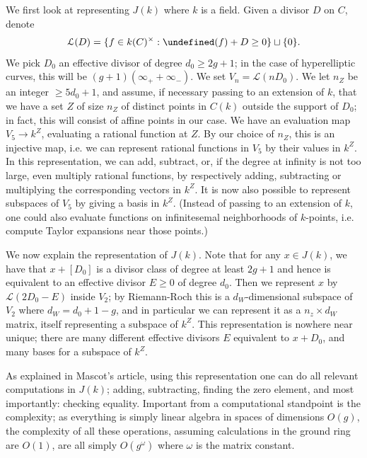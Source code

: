 \documentclass[12pt]{article}
\newcommand{\Lcal}{\mathcal{L}}
\let\div\undefined
\DeclareMathOperator{\div}{div}
\theoremstyle{plain}
\theoremstyle{definition}
\theoremstyle{remark}
\begin{document}
We first look at representing $J(k)$ where $k$ is a field. Given a divisor $D$ on $C$, denote
\[
\Lcal(D) = \{f \in k(C)^\times : \div(f) + D \geq 0 \} \sqcup \{0\}.
\]
We pick $D_0$ an effective divisor of degree $d_0 \geq 2g+1$; in the case of hyperelliptic curves, this will be $(g+1)(\infty_+ + \infty_-)$. We set $V_n = \Lcal(nD_0)$. We let $n_Z$ be an integer $\geq 5d_0 + 1$, and assume, if necessary passing to an extension of $k$, that we have a set $Z$ of size $n_Z$ of distinct points in $C(k)$ outside the support of $D_0$; in fact, this will consist of affine points in our case. We have an evaluation map $V_5 \to k^Z$, evaluating a rational function at $Z$. By our choice of $n_Z$, this is an injective map, i.e. we can represent rational functions in $V_5$ by their values in $k^Z$. In this representation, we can add, subtract, or, if the degree at infinity is not too large, even multiply rational functions, by respectively adding, subtracting or multiplying the corresponding vectors in $k^Z$. It is now also possible to represent subspaces of $V_5$ by giving a basis in $k^Z$. (Instead of passing to an extension of $k$, one could also evaluate functions on infinitesemal neighborhoods of $k$-points, i.e. compute Taylor expansions near those points.)

We now explain the representation of $J(k)$. Note that for any $x \in J(k)$, we have that $x + [D_0]$ is a divisor class of degree at least $2g+1$ and hence is equivalent to an effective divisor $E \geq 0$ of degree $d_0$. Then we represent $x$ by $\Lcal(2D_0 - E)$ inside $V_2$; by Riemann-Roch this is a $d_W$-dimensional subspace of $V_2$ where $d_W = d_0 + 1 - g$, and in particular we can represent it as a $n_z \times d_W$ matrix, itself representing a subspace of $k^Z$. This representation is nowhere near unique; there are many different effective divisors $E$ equivalent to $x + D_0$, and many bases for a subspace of $k^Z$.

As explained in Mascot's article, using this representation one can do all relevant computations in $J(k)$; adding, subtracting, finding the zero element, and most importantly: checking equality. Important from a computational standpoint is the complexity; as everything is simply linear algebra in spaces of dimensions $O(g)$, the complexity of all these operations, assuming calculations in the ground ring are $O(1)$, are all simply $O(g^\omega)$ where $\omega$ is the matrix constant.
\end{document}
